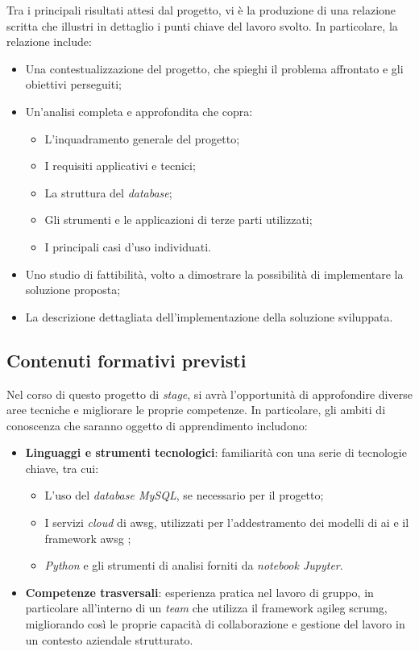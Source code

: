 Tra i principali risultati attesi dal progetto, vi è la produzione di una relazione scritta che illustri in dettaglio i punti chiave del lavoro svolto. In particolare, la relazione include:

\begin{itemize}
    \item Una contestualizzazione del progetto, che spieghi il problema affrontato e gli obiettivi perseguiti;
    \item Un'analisi completa e approfondita che copra:
    \begin{itemize}
        \item L'inquadramento generale del progetto;
        \item I requisiti applicativi e tecnici;
        \item La struttura del \emph{database};
        \item Gli strumenti e le applicazioni di terze parti utilizzati;
        \item I principali casi d'uso individuati.
    \end{itemize}
    \item Uno studio di fattibilità, volto a dimostrare la possibilità di implementare la soluzione proposta;
    \item La descrizione dettagliata dell'implementazione della soluzione sviluppata.
\end{itemize}

\subsection{Contenuti formativi previsti}

Nel corso di questo progetto di \emph{stage}, si avrà l'opportunità di approfondire diverse aree tecniche e migliorare le proprie competenze. In particolare, gli ambiti di conoscenza che saranno oggetto di apprendimento includono:

\begin{itemize}
    \item \textbf{Linguaggi e strumenti tecnologici}: familiarità con una serie di tecnologie chiave, tra cui:
    \begin{itemize}
        \item L'uso del \emph{database MySQL}, se necessario per il progetto;
        \item I servizi \emph{cloud} di \gls{awsg}, utilizzati per l'addestramento dei modelli di \gls{ai} e il framework \gls{awsg} ;
        \item \emph{Python} e gli strumenti di analisi forniti da \emph{notebook Jupyter}.
    \end{itemize}
    \item \textbf{Competenze trasversali}: esperienza pratica nel lavoro di gruppo, in particolare all'interno di un \emph{team} che utilizza il framework \gls{agileg} \gls{scrumg}, migliorando così le proprie capacità di collaborazione e gestione del lavoro in un contesto aziendale strutturato.
\end{itemize}


